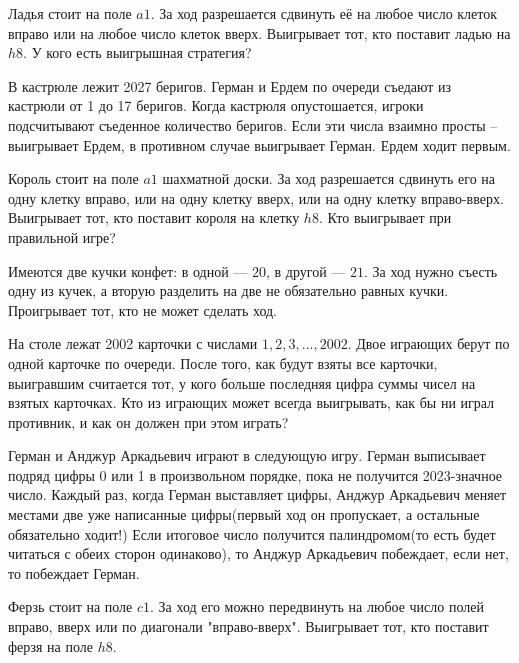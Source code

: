  Ладья стоит на поле $a1$. За ход разрешается сдвинуть её на любое число клеток вправо или на любое число клеток вверх. Выигрывает тот, кто поставит ладью на $h8.$ У кого есть выигрышная стратегия?

В кастрюле лежит 2027 беригов. Герман и Ердем по очереди съедают из кастрюли от 1 до 17 беригов. Когда кастрюля опустошается, игроки подсчитывают съеденное количество беригов. Если эти числа взаимно просты – выигрывает Ердем, в противном случае выигрывает Герман. Ердем ходит первым.

Король стоит на поле $a1$ шахматной доски. За ход разрешается сдвинуть его на одну клетку вправо, или на одну клетку вверх, или на одну клетку вправо-вверх. Выигрывает тот, кто поставит короля на клетку $h8$. Кто выигрывает при правильной игре?

Имеются две кучки конфет: в одной --- $20$, в другой --- $21$. За ход нужно съесть одну из кучек, а вторую разделить на две не обязательно равных кучки. Проигрывает тот, кто не может сделать ход.

На столе лежат 2002 карточки с числами $1, 2, 3,... , 2002$. Двое играющих берут по одной карточке по очереди. После того, как будут взяты все карточки, выигравшим считается тот, у кого больше последняя цифра суммы чисел на взятых карточках. Кто из играющих может всегда выигрывать, как бы ни играл противник, и как он должен при этом играть?

 Герман и Анджур Аркадьевич играют в следующую игру. Герман выписывает подряд цифры 0 или 1 в произвольном порядке, пока не получится 2023-значное число. Каждый раз, когда Герман выставляет цифры, Анджур Аркадьевич меняет местами две уже написанные цифры(первый ход он пропускает, а остальные обязательно ходит!) Если итоговое число получится палиндромом(то есть будет читаться с обеих сторон одинаково), то Анджур Аркадьевич побеждает, если нет, то побеждает Герман.

 Ферзь стоит на поле $c1$. За ход его можно передвинуть на любое число полей вправо, вверх или по диагонали "вправо-вверх". Выигрывает тот, кто поставит ферзя на поле $h8$.
